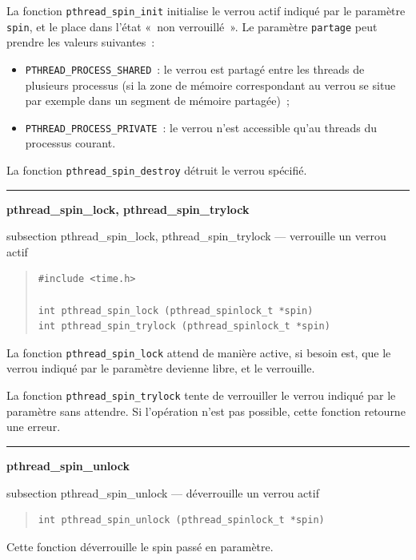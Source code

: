 \documentclass [twoside] {report}
\newcommand {\primitive} [1]
    {
	\phantomsection
	{\large \textbf {#1}}
	\addcontentsline {toc} {subsection} {#1}
    }
\newcommand {\separation}
    {
	\vspace {5mm}
	\nopagebreak
	\hrule
    }
\begin{document}
La fonction \verb|pthread_spin_init| initialise le verrou actif indiqué
par le paramètre \texttt {spin}, et le place dans l'état «~non
verrouillé~».  Le paramètre \texttt {partage} peut prendre les
valeurs suivantes~:

\begin {itemize}
    \item \verb|PTHREAD_PROCESS_SHARED|~: le verrou
	est partagé entre les threads de plusieurs processus (si la zone
	de mémoire correspondant au verrou se situe par exemple dans un
	segment de mémoire partagée)~;
    \item \verb|PTHREAD_PROCESS_PRIVATE|~: le verrou n'est accessible
	qu'au threads du processus courant.
\end {itemize}

La fonction \verb|pthread_spin_destroy| détruit le verrou spécifié.


\separation
\primitive {pthread\_spin\_lock, pthread\_spin\_trylock} --- verrouille un verrou actif

\begin {quote}
\begin {verbatim}
#include <time.h>

int pthread_spin_lock (pthread_spinlock_t *spin)
int pthread_spin_trylock (pthread_spinlock_t *spin)
\end{verbatim}
\end {quote}

La fonction \verb|pthread_spin_lock| attend de manière active, si
besoin est, que le verrou indiqué par le paramètre devienne libre,
et le verrouille.

La fonction \verb|pthread_spin_trylock| tente de verrouiller le verrou
indiqué par le paramètre sans attendre. Si l'opération n'est pas
possible, cette fonction retourne une erreur.



\separation
\primitive {pthread\_spin\_unlock} --- déverrouille un verrou actif

\begin {quote}
\begin {verbatim}
int pthread_spin_unlock (pthread_spinlock_t *spin)
\end{verbatim}
\end {quote}

Cette fonction déverrouille le spin passé en paramètre.
\end{document}
